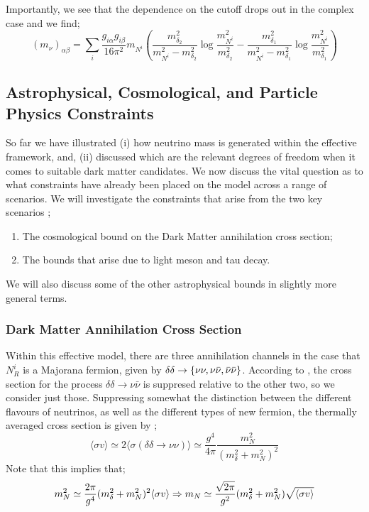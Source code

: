 \documentclass[10pt]{article}
\begin{document}
Importantly, we see that the dependence on the cutoff drops out in the complex case and we find;
\begin{equation}
  (m_\nu)_{\alpha\beta} = \sum_{i}{\frac{g_{i\alpha}g_{i\beta}}{16\pi^2}m_{N^i}\left(\frac{m_{\delta_2}^2}{m_{N^i}^2 - m_{\delta_2}^2}\log\frac{m_{N^i}^2}{m_{\delta_2}^2} - \frac{m_{\delta_1}^2}{m_{N^i}^2 - m_{\delta_1}^2}\log\frac{m_{N^i}^2}{m_{\delta_1}^2}\right)}
\end{equation}
\subsection{Astrophysical, Cosmological, and Particle Physics Constraints}
So far we have illustrated (i) how neutrino mass is generated within the effective framework, and, (ii) discussed which are the relevant degrees of freedom when it comes to suitable dark matter candidates. We now discuss the vital question as to what constraints have already been placed on the model across a range of scenarios. We will investigate the constraints that arise from the two key scenarios \cite{Boehm2006, Franarin2018, Farzan2009, Farzan2011, Farzan2014, Farzan2010};
\begin{enumerate}
  \item The cosmological bound on the Dark Matter annihilation cross section;
  \item The bounds that arise due to light meson and tau decay.
\end{enumerate}
We will also discuss some of the other astrophysical bounds in slightly more general terms.
\subsubsection{Dark Matter Annihilation Cross Section}
Within this effective model, there are three annihilation channels in the case that $N^i_R$ is a Majorana fermion, given by $\delta \delta \rightarrow \left\{\nu\nu, \nu\bar{\nu}, \bar{\nu}\bar{\nu}\right\}$. According to \cite{Boehm2006}, the cross section for the process $\delta\delta \rightarrow \nu\bar{\nu}$ is suppresed relative to the other two, so we consider just those. Suppressing somewhat the distinction between the different flavours of neutrinos, as well as the different types of new fermion, the thermally averaged cross section is given by \cite{Boehm2006};
\begin{equation}
  \langle \sigma v \rangle \simeq 2\langle\sigma(\delta\delta \rightarrow \nu \nu) \rangle \simeq \frac{g^4}{4\pi}\frac{m_N^2}{(m_\delta^2 + m_N^2)^2}
\end{equation}
Note that this implies that;
\begin{dmath}\label{eq:mN}
  m_N^2 \simeq \frac{2\pi}{g^4}(m_\delta^2 + m_N^2)^2 \langle \sigma v \rangle \Rightarrow m_N \nobreak \simeq \frac{\sqrt{2\pi}}{g^2}(m_\delta^2 + m_N^2)\sqrt{\langle\sigma v\rangle}
\end{dmath}
\end{document}
